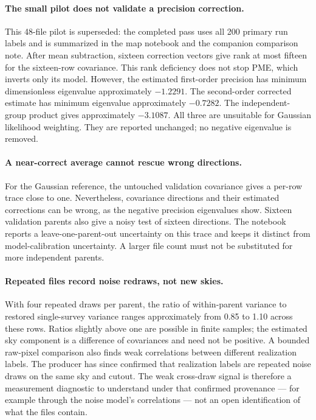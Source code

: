 \documentclass[11pt]{article}
\begin{document}
\paragraph{The small pilot does not validate a precision correction.}
This 48-file pilot is superseded: the completed pass uses all 200 primary
run labels and is summarized in the map notebook and the companion
comparison note. After mean subtraction, sixteen correction vectors give rank at most
fifteen for the sixteen-row covariance. This rank deficiency does not stop
PME, which inverts only its model. However, the estimated first-order
precision has minimum dimensionless eigenvalue approximately $-1.2291$.
The second-order corrected estimate has minimum eigenvalue approximately
$-0.7282$. The independent-group product gives approximately $-3.1087$.
All three are unsuitable for Gaussian likelihood weighting. They are
reported unchanged; no negative eigenvalue is removed.

\paragraph{A near-correct average cannot rescue wrong directions.}
For the Gaussian reference, the untouched validation covariance gives a
per-row trace close to one. Nevertheless, covariance directions
and their estimated corrections can be wrong, as the negative precision
eigenvalues show. Sixteen validation parents also give a noisy test of
sixteen directions. The notebook reports a leave-one-parent-out uncertainty
on this trace and keeps it distinct from model-calibration uncertainty.
A larger file count must not be substituted for more independent parents.

\paragraph{Repeated files record noise redraws, not new skies.}
With four repeated draws per parent, the ratio of within-parent variance
to restored single-survey variance ranges approximately from 0.85 to 1.10
across these rows. Ratios slightly above one are possible in finite samples;
the estimated sky component is a difference of covariances and need not
be positive. A bounded raw-pixel comparison also finds weak correlations
between different realization labels. The producer has since confirmed
that realization labels are repeated noise draws on the same sky and
cutout. The weak cross-draw signal is therefore a measurement diagnostic
to understand under that confirmed provenance --- for example through the
noise model's correlations --- not an open identification of what the
files contain.
\end{document}
